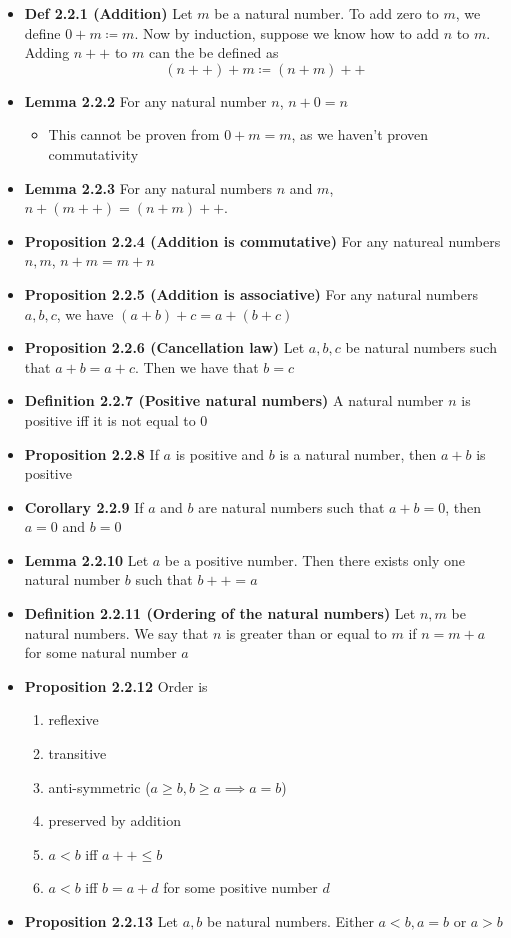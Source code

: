 \documentclass[11pt]{article}
\begin{document}
\begin{itemize}
  \item \textbf{Def 2.2.1 (Addition)} Let $m$ be a natural number. To add zero to $m$, we define $0 + m \coloneqq m$. Now by induction, suppose we know how to add $n$ to $m$. Adding $n++$ to $m$ can the be defined as
  \[
    (n++)+m \coloneqq (n+m)++
  \]
  \item \textbf{Lemma 2.2.2} For any natural number $n$, $n+0 = n$
  \begin{itemize}
    \item This cannot be proven from $0 + m = m$, as we haven't proven commutativity
  \end{itemize}
  \item \textbf{Lemma 2.2.3} For any natural numbers $n$ and $m$, $n+(m++) = (n+m)++$.
  \item \textbf{Proposition 2.2.4 (Addition is commutative)} For any natureal numbers $n,m$, $n+m = m + n$
  \item \textbf{Proposition 2.2.5 (Addition is associative)} For any natural numbers $a,b,c$, we have $(a+b)+c = a+(b+c)$
  \item \textbf{Proposition 2.2.6 (Cancellation law)} Let $a,b,c$ be natural numbers such that $a+b = a+c$. Then we have that $b=c$
  \item \textbf{Definition 2.2.7 (Positive natural numbers)} A natural number $n$ is positive iff it is not equal to 0
  \item \textbf{Proposition 2.2.8} If $a$ is positive and $b$ is a natural number, then $a+b$ is positive
  \item \textbf{Corollary 2.2.9} If $a$ and $b$ are natural numbers such that $a+b = 0$, then $a=0$ and $b=0$
  \item \textbf{Lemma 2.2.10} Let $a$ be a positive number. Then there exists only one natural number $b$ such that $b++ = a$
  \item \textbf{Definition 2.2.11 (Ordering of the natural numbers)} Let $n,m$ be natural numbers. We say that $n$ is greater than or equal to $m$ if $n = m + a$ for some natural number $a$
  \item \textbf{Proposition 2.2.12} Order is
  \begin{enumerate}
    \item reflexive
    \item transitive
    \item anti-symmetric ($a \geqslant b, b \geqslant a \implies a =b$)
    \item preserved by addition
    \item $a < b$ iff $a++ \leqslant b$
    \item $a < b$ iff $b = a + d$ for some positive number $d$
  \end{enumerate}
  \item \textbf{Proposition 2.2.13} Let $a,b$ be natural numbers. Either $a < b, a=b$ or $a > b$
\end{itemize}
\end{document}

